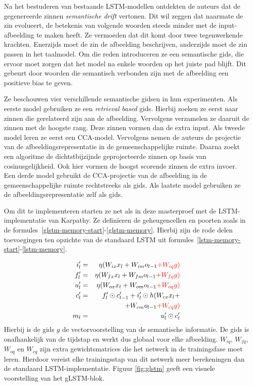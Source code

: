 Na het bestuderen van bestaande LSTM-modellen ontdekten de auteurs dat de gegenereerde zinnen \emph{semantische drift} vertonen. Dit wil zeggen dat naarmate de zin evolueert, de betekenis van volgende woorden steeds minder met de input-afbeelding te maken heeft. Ze vermoeden dat dit komt door twee tegenwerkende krachten. Enerzijds moet de zin de afbeelding beschrijven, anderzijds moet de zin passen in het taalmodel. Om die reden introduceren ze een semantische gids, die ervoor moet zorgen dat het model na enkele woorden op het juiste pad blijft. Dit gebeurt door woorden die semantisch verbonden zijn met de afbeelding een positieve bias te geven.

Ze beschouwen vier verschillende semantische gidsen in hun experimenten. Als eerste model gebruiken ze een \emph{retrieval based} gids. Hierbij zoeken ze eerst naar zinnen die gerelateerd zijn aan de afbeelding. Vervolgens verzamelen ze daaruit de zinnen met de hoogste rang. Deze zinnen vormen dan de extra input.
Als tweede model leren ze eerst een CCA-model. Vervolgens nemen de auteurs de projectie van de afbeeldingsrepresentatie in de gemeenschappelijke ruimte. Daarna zoekt een algoritme de dichtstbijzijnde geprojecteerde zinnen op basis van cosinusgelijkheid. Ook hier vormen de hoogst scorende zinnen de extra invoer.
Een derde model gebruikt de CCA-projectie van de afbeelding in de gemeenschappelijke ruimte rechtstreeks als gids.
Als laatste model gebruiken ze de afbeeldingsrepresentatie zelf als gids.

Om dit te implementeren starten ze net als in deze masterproef met de LSTM-implementatie van Karpathy. Ze defin\"ieren de geheugencellen en poorten zoals in de formules~\eqref{glstm-memory-start}-\eqref{glstm-memory}. Hierbij zijn de rode delen toevoegingen ten opzichte van de standaard LSTM uit formules~\eqref{lstm-memory-start}-\eqref{lstm-memory}.

%
\begin{eqnarray}
\vspace{-3mm}
\label{glstm-memory-start}
i_l' & = & \eta (W_{ix} x_l + W_{im} o_{l-1} \color{red}{+ W_{iq} g}) \label{glstm-input} \\
f_l' & = & \eta (W_{fx} x_l + W_{fm} o_{l-1} \color{red}{+ W_{fq} g}) \\
u_l' & = & \eta (W_{ox} x_l + W_{om} o_{l-1} \color{red}{+ W_{oq} g}) \\
c_l' & = & f_l' \odot c_{l-1}' + i_l' \odot h(W_{cx} x_l + \nonumber \\
&   & + W_{cm} o_{l-1} \color{red}{+ W_{cq} g}) \\
m_l & = & u_l' \odot c_l'
\label{glstm-memory}
\vspace{-3mm}
\end{eqnarray}
Hierbij is de gids $g$ de vectorvoorstelling van de semantische informatie. De gids is onafhankelijk van de tijdstap en werkt dus globaal voor elke afbeelding. $W_{iq}$, $W_{fq}$, $W_{oq}$ en $W_{cq}$ zijn extra gewichtsmatrices die het netwerk in de trainingsfase moet leren. Hierdoor vereist elke trainingsstap van dit netwerk meer berekeningen dan de standaard LSTM-implementatie. Figuur \ref{fig:glstm} geeft een visuele voorstelling van het gLSTM-blok.

